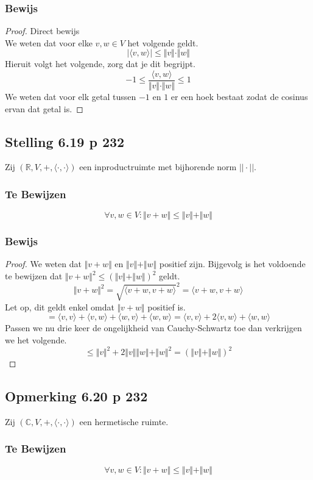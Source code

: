 \documentclass[lineaire_algebra_oplossingen.tex]{subfiles}
\begin{document}
\subsubsection*{Bewijs}
\begin{proof}
Direct bewijs\\
We weten dat voor elke $v,w\in V$ het volgende geldt.
\[
\vert\langle v,w\rangle\vert \le \Vert v\Vert\cdot \Vert w\Vert
\]
Hieruit volgt het volgende, zorg dat je dit begrijpt.
\[
-1 \le \frac{\langle v,w\rangle}{\Vert v\Vert\cdot \Vert w\Vert} \le 1
\]
We weten dat voor elk getal tussen $-1$ en $1$ er een hoek bestaat zodat de cosinus ervan dat getal is.
\end{proof}

\subsection{Stelling 6.19 p 232}
Zij $(\mathbb{R},V,+,\langle\cdot,\cdot\rangle)$ een inproductruimte met bijhorende norm $||\cdot ||$.
\subsubsection*{Te Bewijzen}
\[
\forall v,w \in V: \Vert v+w \Vert \le \Vert v\Vert + \Vert w\Vert
\]
\subsubsection*{Bewijs}
\begin{proof}
We weten dat $\Vert v+w \Vert$ en $\Vert v\Vert + \Vert w\Vert$ positief zijn. Bijgevolg is het voldoende te bewijzen dat $\Vert v+w \Vert^2 \le (\Vert v\Vert + \Vert w\Vert)^2$ geldt.
\[
 \Vert v+w \Vert^2 = \sqrt{\langle v+w,v+w\rangle}^2 = \langle v+w,v+w\rangle
\]
Let op, dit geldt enkel omdat $\Vert v+w \Vert$ positief is.
\[
= \langle v,v\rangle + \langle v,w\rangle + \langle w,v \rangle + \langle w,w \rangle =  \langle v,v\rangle + 2\langle v,w\rangle + \langle w,w \rangle
\]
Passen we nu drie keer de ongelijkheid van Cauchy-Schwartz toe dan verkrijgen we het volgende.
\[
\le \Vert v\Vert^2 + 2\Vert v\Vert \Vert w\Vert + \Vert w\Vert^2 = (\Vert v\Vert + \Vert w\Vert)^2
\]
\end{proof}

\subsection{Opmerking 6.20 p 232}
Zij $(\mathbb{C},V,+,\langle\cdot,\cdot\rangle)$ een hermetische ruimte.
\subsubsection*{Te Bewijzen}
\[
\forall v,w \in V: \Vert v+w \Vert \le \Vert v\Vert + \Vert w\Vert
\]
\end{document}
